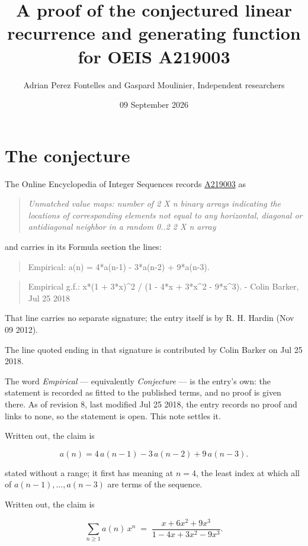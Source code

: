 \documentclass[11pt]{article}
\title{A proof of the conjectured linear recurrence and generating function for OEIS A219003}
\author{Adrian Perez Fontelles and Gaspard Moulinier, Independent researchers}
\date{09 September 2026}
\theoremstyle{definition}
\begin{document}
\maketitle
\section{The conjecture}

The Online Encyclopedia of Integer Sequences records \href{https://oeis.org/A219003}{A219003} as

\begin{quote}\itshape Unmatched value maps: number of 2 X n binary arrays indicating the locations of corresponding elements not equal to any horizontal, diagonal or antidiagonal neighbor in a random 0..2 2 X n array\end{quote}

and carries in its Formula section the lines:

\begin{quote}\ttfamily Empirical: a(n) = 4*a(n-1) - 3*a(n-2) + 9*a(n-3).\end{quote}

\begin{quote}\ttfamily Empirical g.f.: x*(1 + 3*x)\textasciicircum{}2 / (1 - 4*x + 3*x\textasciicircum{}2 - 9*x\textasciicircum{}3). - Colin Barker, Jul 25 2018\end{quote}

That line carries no separate signature; the entry itself is by R. H. Hardin (Nov 09 2012).

The line quoted ending in that signature is contributed by Colin Barker on Jul 25 2018.

The word {\itshape Empirical} --- equivalently {\itshape Conjecture} --- is the entry's own: the statement is recorded as fitted to the published terms, and no proof is given there. As of revision 8, last modified Jul 25 2018, the entry records no proof and links to none, so the statement is open. This note settles it.

Written out, the claim is

\[a(n) = 4\,a(n-1) - 3\,a(n-2) + 9\,a(n-3).\]

stated without a range; it first has meaning at $n = 4$, the least index at which all of $a(n-1),\dots,a(n-3)$ are terms of the sequence.

Written out, the claim is

\[\sum_{n \ge 1} a(n)\,x^n \;=\; \frac{x + 6x^{2} + 9x^{3}}{1 - 4x + 3x^{2} - 9x^{3}}.\]
\end{document}
